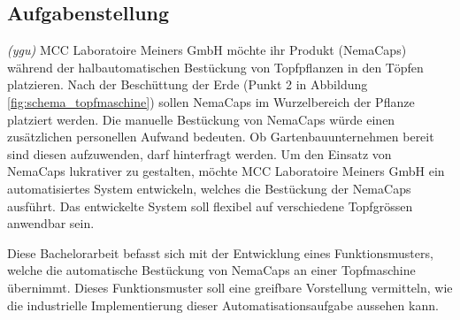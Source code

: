 \subsection{Aufgabenstellung}
\textit{(ygu)} MCC Laboratoire Meiners GmbH möchte ihr Produkt (NemaCaps) während der halbautomatischen Bestückung von Topfpflanzen in den Töpfen platzieren. Nach der Beschüttung der Erde (Punkt 2 in Abbildung \ref{fig:schema_topfmaschine}) sollen NemaCaps im Wurzelbereich der Pflanze platziert werden. Die manuelle Bestückung von NemaCaps würde einen zusätzlichen personellen Aufwand bedeuten. Ob Gartenbauunternehmen bereit sind diesen aufzuwenden, darf hinterfragt werden. Um den Einsatz von NemaCaps lukrativer zu gestalten, möchte MCC Laboratoire Meiners GmbH ein automatisiertes System entwickeln, welches die Bestückung der NemaCaps ausführt. Das entwickelte System soll flexibel auf verschiedene Topfgrössen anwendbar sein.
\newline

Diese Bachelorarbeit befasst sich mit der Entwicklung eines Funktionsmusters, welche die automatische Bestückung von NemaCaps an einer Topfmaschine übernimmt. Dieses Funktionsmuster soll eine greifbare Vorstellung vermitteln, wie die industrielle Implementierung dieser Automatisationsaufgabe aussehen kann. 
\newline 

